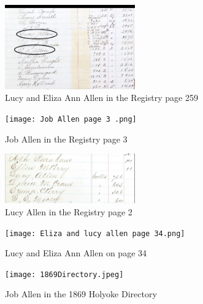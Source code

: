 \documentclass[
  letterpaper,
  DIV=11,
  numbers=noendperiod]{scrartcl}
\begin{document}
\begin{figure}

{\centering \includegraphics[width=0.5\textwidth,height=\textheight]{Mary and Eliza Allen.jpeg}

}

\caption{\label{fig-sample4}Lucy and Eliza Ann Allen in the Registry
page 259}

\end{figure}

\begin{figure}

{\centering \texttt{[image: Job Allen page 3 .png]}

}

\caption{\label{fig-sample7}Job Allen in the Registry page 3}

\end{figure}

\begin{figure}

{\centering \includegraphics[width=0.5\textwidth,height=\textheight]{Lucypg2.jpeg}

}

\caption{\label{fig-sample9}Lucy Allen in the Registry page 2}

\end{figure}

\begin{figure}

{\centering \texttt{[image: Eliza and lucy allen page 34.png]}

}

\caption{\label{fig-sample10}Lucy and Eliza Ann Allen on page 34}

\end{figure}

\begin{figure}

{\centering \texttt{[image: 1869Directory.jpeg]}

}

\caption{\label{fig-sample11}Job Allen in the 1869 Holyoke Directory}

\end{figure}
\end{document}
